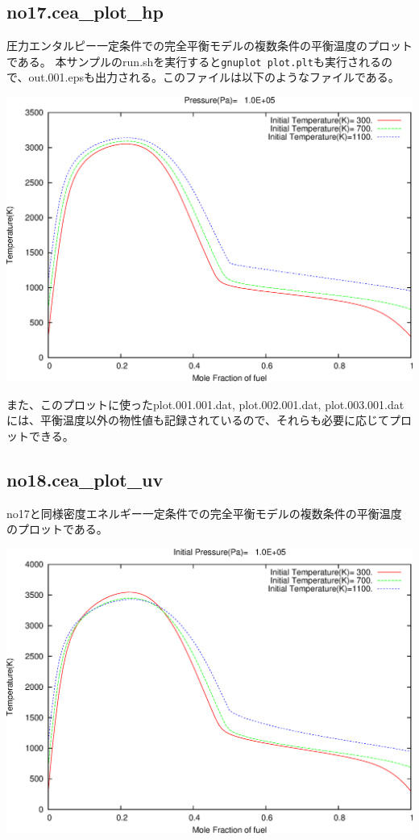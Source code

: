 \documentclass{jsarticle}
\begin{document}
\subsection{no17.cea\_plot\_hp}%
圧力エンタルピー一定条件での完全平衡モデルの複数条件の平衡温度のプロットである。
本サンプルのrun.shを実行すると\verb|gnuplot plot.plt|も実行されるので、out.001.epsも出力される。このファイルは以下のようなファイルである。
\begin{center}
\includegraphics[width=.65\textwidth]{sample/no17.eps}
\end{center}
また、このプロットに使ったplot.001.001.dat, plot.002.001.dat, plot.003.001.datには、平衡温度以外の物性値も記録されているので、それらも必要に応じてプロットできる。
\subsection{no18.cea\_plot\_uv}%
no17と同様密度エネルギー一定条件での完全平衡モデルの複数条件の平衡温度のプロットである。
\begin{center}
\includegraphics[width=.65\textwidth]{sample/no18.eps}
\end{center}
\end{document}
